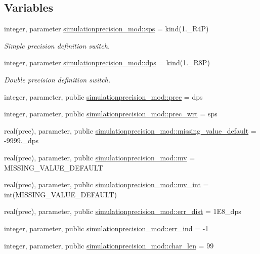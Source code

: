 \subsection*{Variables}
\begin{DoxyCompactItemize}
\item 
integer, parameter \mbox{\hyperlink{namespacesimulationprecision__mod_a4e5f74805628e67a1d7b33106780b85d}{simulationprecision\+\_\+mod\+::sps}} = kind(1.\+\_\+\+R4P)
\begin{DoxyCompactList}\small\item\em Simple precision definition switch. \end{DoxyCompactList}\item 
integer, parameter \mbox{\hyperlink{namespacesimulationprecision__mod_a1993497bc3b1b9925d3e409fe8891e8c}{simulationprecision\+\_\+mod\+::dps}} = kind(1.\+\_\+\+R8P)
\begin{DoxyCompactList}\small\item\em Double precision definition switch. \end{DoxyCompactList}\item 
integer, parameter, public \mbox{\hyperlink{namespacesimulationprecision__mod_a361ca48174e0dc2228c07f25fa5396ec}{simulationprecision\+\_\+mod\+::prec}} = dps
\item 
integer, parameter, public \mbox{\hyperlink{namespacesimulationprecision__mod_a2afc058035b6678d4ba773117f7c5202}{simulationprecision\+\_\+mod\+::prec\+\_\+wrt}} = sps
\item 
real(prec), parameter, public \mbox{\hyperlink{namespacesimulationprecision__mod_a8fe62365170cdfed5a745be6d8e99e1c}{simulationprecision\+\_\+mod\+::missing\+\_\+value\+\_\+default}} = -\/9999.\+\_\+dps
\item 
real(prec), parameter, public \mbox{\hyperlink{namespacesimulationprecision__mod_aee970e36f3dc8fb77c175ead993257d9}{simulationprecision\+\_\+mod\+::mv}} = M\+I\+S\+S\+I\+N\+G\+\_\+\+V\+A\+L\+U\+E\+\_\+\+D\+E\+F\+A\+U\+LT
\item 
real(prec), parameter, public \mbox{\hyperlink{namespacesimulationprecision__mod_a8d1d7d124b73efb89060c2d696b87bea}{simulationprecision\+\_\+mod\+::mv\+\_\+int}} = int(M\+I\+S\+S\+I\+N\+G\+\_\+\+V\+A\+L\+U\+E\+\_\+\+D\+E\+F\+A\+U\+LT)
\item 
real(prec), parameter, public \mbox{\hyperlink{namespacesimulationprecision__mod_adb76b934d7acaf56b275c5cc1ecccc4c}{simulationprecision\+\_\+mod\+::err\+\_\+dist}} = 1\+E8\+\_\+dps
\item 
integer, parameter, public \mbox{\hyperlink{namespacesimulationprecision__mod_a7931657e14fb825c4e20dc77ee8f7278}{simulationprecision\+\_\+mod\+::err\+\_\+ind}} = -\/1
\item 
integer, parameter, public \mbox{\hyperlink{namespacesimulationprecision__mod_aba0af56595baca30b62618cc8c05883c}{simulationprecision\+\_\+mod\+::char\+\_\+len}} = 99
\end{DoxyCompactItemize}
